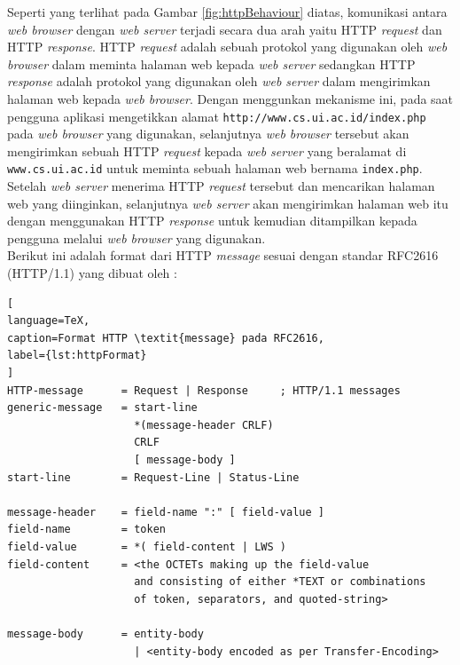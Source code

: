 Seperti yang terlihat pada Gambar \ref{fig:httpBehaviour} diatas, komunikasi antara \textit{web browser} dengan \textit{web server} terjadi secara dua arah yaitu HTTP \textit{request} dan HTTP \textit{response}. HTTP \textit{request} adalah sebuah protokol yang digunakan oleh \textit{web browser} dalam meminta halaman web kepada \textit{web server} sedangkan HTTP \textit{response} adalah protokol yang digunakan oleh \textit{web server} dalam mengirimkan halaman web kepada \textit{web browser}. Dengan menggunkan mekanisme ini, pada saat pengguna aplikasi mengetikkan alamat \texttt{http://www.cs.ui.ac.id/index.php} pada \textit{web browser} yang digunakan, selanjutnya \textit{web browser} tersebut akan mengirimkan sebuah HTTP \textit{request} kepada \textit{web server} yang beralamat di \texttt{www.cs.ui.ac.id} untuk meminta sebuah halaman web bernama \texttt{index.php}. Setelah \textit{web server} menerima HTTP \textit{request} tersebut dan mencarikan halaman web yang diinginkan, selanjutnya \textit{web server} akan mengirimkan halaman web itu dengan menggunakan HTTP \textit{response} untuk kemudian ditampilkan kepada pengguna melalui \textit{web browser} yang digunakan.\\

Berikut ini adalah format dari HTTP \textit{message} sesuai dengan standar RFC2616 (HTTP/1.1) yang dibuat oleh \cite{webrfc2616}:

\begin{lstlisting}[
language=TeX,
caption=Format HTTP \textit{message} pada RFC2616,
label={lst:httpFormat}
]
HTTP-message      = Request | Response     ; HTTP/1.1 messages
generic-message   = start-line
                    *(message-header CRLF)
                    CRLF
                    [ message-body ]
start-line        = Request-Line | Status-Line

message-header    = field-name ":" [ field-value ]
field-name        = token
field-value       = *( field-content | LWS )
field-content     = <the OCTETs making up the field-value
                    and consisting of either *TEXT or combinations
                    of token, separators, and quoted-string>
                    
message-body      = entity-body
                    | <entity-body encoded as per Transfer-Encoding>

\end{lstlisting}

